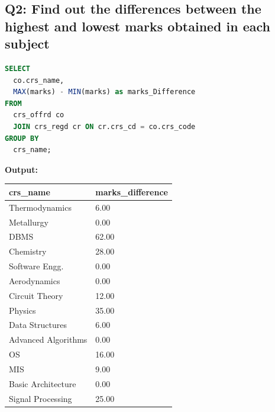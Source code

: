 \documentclass[11pt, a4paper]{article}
\begin{document}
\subsection*{Q2: Find out the differences between the highest and lowest marks obtained in each subject}
\begin{lstlisting}[language=SQL]
SELECT
  co.crs_name,
  MAX(marks) - MIN(marks) as marks_Difference
FROM
  crs_offrd co
  JOIN crs_regd cr ON cr.crs_cd = co.crs_code
GROUP BY
  crs_name;
\end{lstlisting}
\vspace{0.3cm}
\textbf{Output:}\vspace{0.2cm}
\begin{center}
\begin{tabular}{|l|l|}
\hline
\textbf{crs\_name} & \textbf{marks\_difference} \\ \hline
Thermodynamics                      & 6.00 \\ \hline
Metallurgy                          & 0.00 \\ \hline
DBMS                                & 62.00 \\ \hline
Chemistry                           & 28.00 \\ \hline
Software Engg.                      & 0.00 \\ \hline
Aerodynamics                        & 0.00 \\ \hline
Circuit Theory                      & 12.00 \\ \hline
Physics                             & 35.00 \\ \hline
Data Structures                     & 6.00 \\ \hline
Advanced Algorithms                 & 0.00 \\ \hline
OS                                  & 16.00 \\ \hline
MIS                                 & 9.00 \\ \hline
Basic Architecture                  & 0.00 \\ \hline
Signal Processing                   & 25.00 \\ \hline
\end{tabular}
\end{center}
\newpage
\end{document}
